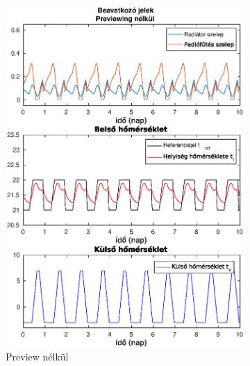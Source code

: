 \begin{figure}[H]
	\begin{subfigure}[t]{0.305\textwidth}
		\centering
		\includegraphics[trim=0 0 0 27, clip,width=\textwidth]{figures/onlab/compare/A_C_P0D0}
		\caption{Preview nélkül}
		\label{fig:mpc-pr0d0}
	\end{subfigure}
	~
	\begin{subfigure}[t]{0.32\textwidth}
		\centering

\end{subfigure}
\end{figure}
